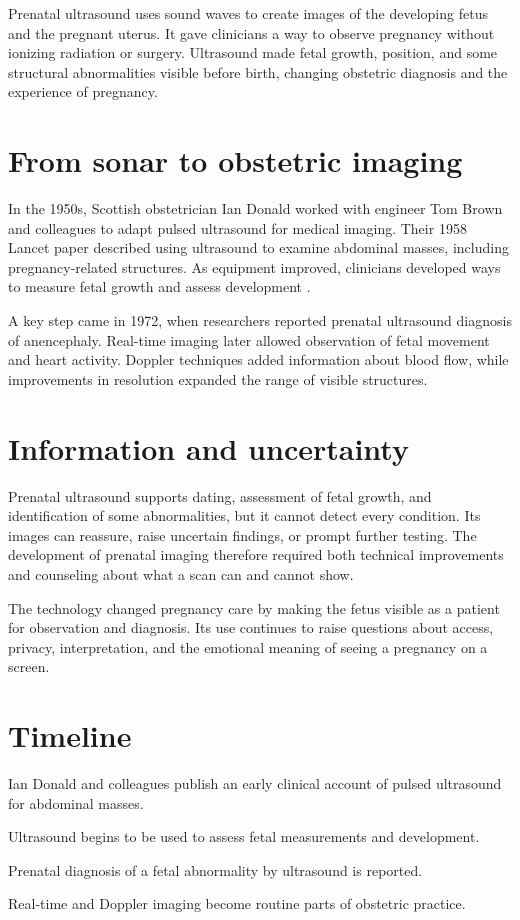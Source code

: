 \documentclass[12pt,oneside]{book}
\begin{document}
Prenatal ultrasound uses sound waves to create images of the developing fetus
and the pregnant uterus. It gave clinicians a way to observe pregnancy without
ionizing radiation or surgery. Ultrasound made fetal growth, position, and
some structural abnormalities visible before birth, changing obstetric
diagnosis and the experience of pregnancy.

\section{From sonar to obstetric imaging}
In the 1950s, Scottish obstetrician Ian Donald worked with engineer Tom Brown and colleagues to adapt pulsed ultrasound for medical imaging. Their 1958 Lancet paper described using ultrasound to examine abdominal masses, including pregnancy-related structures. As equipment improved, clinicians developed ways to measure fetal growth and assess development \cite{prenatalUltrasoundHistory}.

A key step came in 1972, when researchers reported prenatal ultrasound
diagnosis of anencephaly. Real-time imaging later allowed observation of fetal
movement and heart activity. Doppler techniques added information about blood
flow, while improvements in resolution expanded the range of visible
structures.

\section{Information and uncertainty}
Prenatal ultrasound supports dating, assessment of fetal growth, and identification of some abnormalities, but it cannot detect every condition. Its images can reassure, raise uncertain findings, or prompt further testing. The development of prenatal imaging therefore required both technical improvements and counseling about what a scan can and cannot show.

The technology changed pregnancy care by making the fetus visible as a patient
for observation and diagnosis. Its use continues to raise questions about
access, privacy, interpretation, and the emotional meaning of seeing a
pregnancy on a screen.

\section*{Timeline}
\begin{description}[leftmargin=2.3cm,style=nextline]
  \item[1958] Ian Donald and colleagues publish an early clinical account of pulsed ultrasound for abdominal masses.
  \item[1960s] Ultrasound begins to be used to assess fetal measurements and development.
  \item[1972] Prenatal diagnosis of a fetal abnormality by ultrasound is reported.
  \item[Late twentieth century] Real-time and Doppler imaging become routine parts of obstetric practice.
\end{description}
\end{document}
